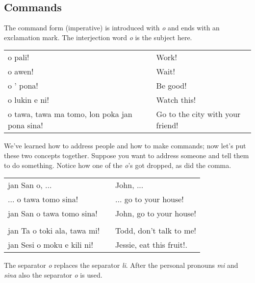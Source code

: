 \subsection*{Commands}
The command form (imperative) is introduced with \textit{o} and ends with an exclamation mark.
The interjection word \textit{o} is the subject here.

\begin{supertabular}{p{5,5cm}|ll}
    o pali!                                       &  & Work!                            \\
    o awen!                                       &  & Wait!                            \\
    o ' pona!                                     &  & Be good!                         \\
    o lukin e ni!                                 &  & Watch this!                      \\
    o tawa, tawa ma tomo, lon poka jan pona sina! &  & Go to the city with your friend! \\
\end{supertabular}

We've learned how to address people and how to make commands; now let's put these two concepts together.
Suppose you want to address someone and tell them to do something.
Notice how one of the \textit{o}'s got dropped, as did the comma.

\begin{supertabular}{p{5,5cm}|ll}
    jan San o, ...              &  & John, ...                \\
    ... o tawa tomo sina!       &  & ... go to your house!    \\
    jan San o tawa tomo sina!   &  & John, go to your house!  \\
                                &  &                          \\
    jan Ta o toki ala, tawa mi! &  & Todd, don't talk to me!  \\
    jan Sesi o moku e kili ni!  &  & Jessie, eat this fruit!. \\
\end{supertabular}

The separator \textit{o} replaces the separator \textit{li}.
After the personal pronouns \textit{mi} and \textit{sina} also the separator \textit{o} is used.

